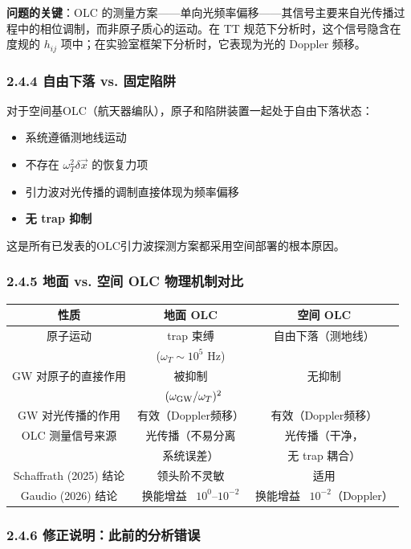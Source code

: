 \documentclass[12pt,a4paper]{article}
\begin{document}
\textbf{问题的关键}：OLC 的测量方案——单向光频率偏移——其信号主要来自光传播过程中的相位调制，而非原子质心的运动。在 TT 规范下分析时，这个信号隐含在度规的 $h_{ij}$ 项中；在实验室框架下分析时，它表现为光的 Doppler 频移。
\subsubsection{2.4.4 自由下落 vs. 固定陷阱}


对于空间基OLC（航天器编队），原子和陷阱装置一起处于自由下落状态：

\begin{itemize}
  \item 系统遵循测地线运动
  \item 不存在 $\omega_T^2 \delta \vec{x}$ 的恢复力项
  \item 引力波对光传播的调制直接体现为频率偏移
  \item \textbf{无 trap 抑制}
\end{itemize}
这是所有已发表的OLC引力波探测方案都采用空间部署的根本原因。
\subsubsection{2.4.5 地面 vs. 空间 OLC 物理机制对比}


\begin{tabular}{|c|c|c|}
\hline
性质 & 地面 OLC & 空间 OLC \\
\hline
原子运动 & trap 束缚 & 自由下落（测地线） \\
 & ($\omega_T \sim 10^5$ Hz) & \\
GW 对原子的直接作用 & 被抑制 & 无抑制 \\
 & ~$(\omega_{\rm GW}/\omega_T)^2$ & \\
GW 对光传播的作用 & 有效（Doppler频移） & 有效（Doppler频移） \\
OLC 测量信号来源 & 光传播（不易分离 & 光传播（干净， \\
 & 系统误差） & 无 trap 耦合） \\
Schaffrath (2025) 结论 & 领头阶不灵敏 & 适用 \\
Gaudio (2026) 结论 & \shortstack{换能增益 \\ ~$10^{0}\text{--}10^{-2}$} & \shortstack{换能增益 \\ ~$10^{-2}$（Doppler）} \\
\hline
\end{tabular}


\subsubsection{2.4.6 修正说明：此前的分析错误}
\end{document}
